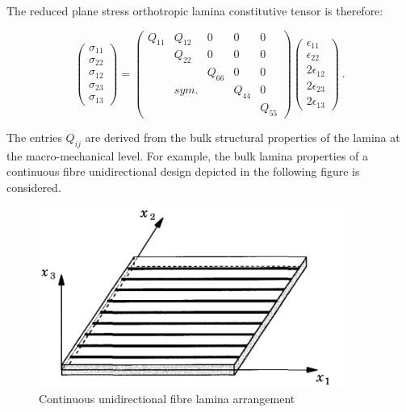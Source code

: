 The reduced plane stress orthotropic lamina constitutive tensor is therefore:

\begin{equation} 
\begin{pmatrix}
\sigma_{11} \\
\sigma_{22} \\
\sigma_{12} \\
\sigma_{23} \\
\sigma_{13} 
\end{pmatrix}
=
\begin{pmatrix}
Q_{11} & Q_{12} &  0 & 0 & 0 \\
\  & Q_{22} &  0 & 0 & 0 \\
\  & \  & Q_{66}  & 0 & 0 \\
\  & sym. & \  & Q_{44} & 0 \\
\  & \  & \  & \ & Q_{55}
\end{pmatrix}
\begin{pmatrix}
\epsilon_{11} \\
\epsilon_{22} \\
2\epsilon_{12}\\
2\epsilon_{23} \\
2\epsilon_{13}
\end{pmatrix}
\label{eqscomp_plane_stress_tensor_unrotated}\ .
\end{equation}

The entries $Q_{ij}$ are derived from the bulk structural properties of the lamina at the macro-mechanical level. For example, the bulk lamina properties of a continuous fibre unidirectional design depicted in the following figure is considered.

\begin{figure}[H]
	\centering
	\includegraphics[width=10cm]{images/composite_unidirectional_lamina}
	\caption{Continuous unidirectional fibre lamina arrangement \cite{reddy2004mechanics}}
	\label{fig:compositeunidirectionallamina}
\end{figure}


